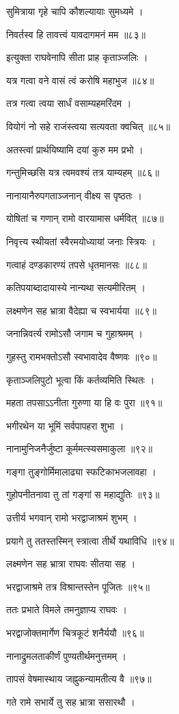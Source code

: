 सुमित्राया गृहे चापि कौशल्यायाः सुमध्यमे ।

निवर्तस्व हि तावत्त्वं यावदागमनं मम ॥८३॥

इत्युक्ता राघवेनापि सीता प्राह कृताञ्जलिः ।

यत्र गत्वा वने वासं त्वं करोषि महाभुज ॥८४॥

तत्र गत्वा त्वया सार्धं वसाम्यहमरिंदम ।

वियोगं नो सहे राजंस्त्वया सत्यवता क्वचित् ॥८५॥

अतस्त्वां प्रार्थयिष्यामि दयां कुरु मम प्रभो ।

गन्तुमिच्छसि यत्र त्वमवश्यं तत्र याम्यहम् ॥८६॥

नानायानैरुपगताञ्जनान् वीक्ष्य स पृष्ठतः ।

योषितां च गणान् रामो वारयामास धर्मवित् ॥८७॥

निवृत्त्य स्थीयतां स्वैरमयोध्यायां जनाः स्त्रियः ।

गत्वाहं दण्डकारण्यं तपसे धृतमानसः ॥८८॥

कतिपयाब्दादायास्ये नान्यथा सत्यमीरितम् ।

लक्ष्मणेन सह भ्रात्रा वैदेह्या च स्वभार्यया ॥८९॥

जनान्निवर्त्य रामोऽसौ जगाम च गुहाश्रमम् ।

गुहस्तु रामभक्तोऽसौ स्वभावादेव वैष्णवः ॥९०॥

कृताञ्जलिपुटो भूत्वा किं कर्तव्यमिति स्थितः ।

महता तपसाऽऽनीता गुरुणा या हि वः पुरा ॥९१॥

भगीरथेन या भूमिं सर्वपापहरा शुभा ।

नानामुनिजनैर्जुष्टा कूर्ममत्स्यसमाकुला ॥९२॥

गङ्गा तुङ्गोर्मिमालाढ्या स्फटिकाभजलावहा ।

गुहोपनीतनावा तु तां गङ्गां स महाद्युतिः ॥९३॥

उत्तीर्य भगवान् रामो भरद्वाजाश्रमं शुभम् ।

प्रयागे तु ततस्तस्मिन् स्त्रात्वा तीर्थे यथाविधि ॥९४॥

लक्ष्मणेन सह भ्रात्रा राघवः सीतया सह ।

भरद्वाजाश्रमे तत्र विश्रान्तस्तेन पूजितः ॥९५॥

ततः प्रभाते विमले तमनुज्ञाप्य राघवः ।

भरद्वाजोक्तमार्गेण चित्रकूटं शनैर्ययौ ॥९६॥

नानाद्रुमलताकीर्णं पुण्यतीर्थमनुत्तमम् ।

तापसं वेषमास्थाय जह्नुकन्यामतीत्य वै ॥९७॥

गते रामे सभार्ये तु सह भ्रात्रा ससारथौ ।

